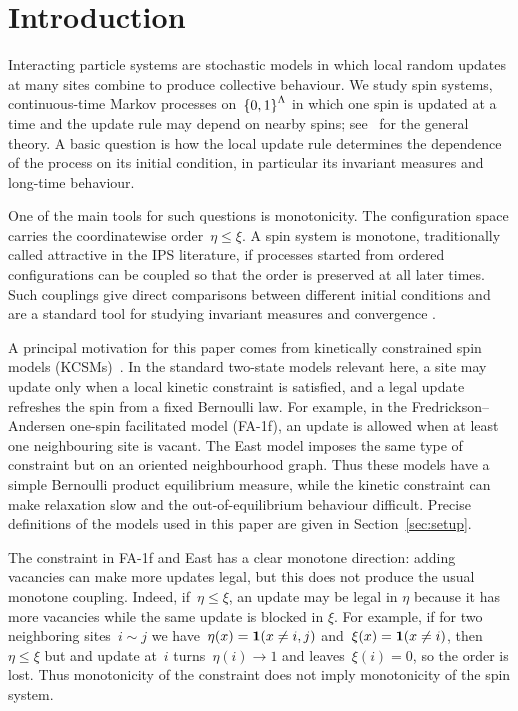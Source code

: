 \documentclass[EJP,preprint,NODS,nobera]{ejpecp}
\begin{document}
\tableofcontents

\section{Introduction}
\label{sec:introduction}

Interacting particle systems are stochastic models in which local random
updates at many sites combine to produce collective behaviour. We study spin
systems, continuous-time Markov processes on~$\left\{0,1\right\}^{\Lambda}$ in which
one spin is updated at a time and the update rule may depend on nearby spins;
see~\cite{Liggett1985} for the general theory. A basic question is how the
local update rule determines the dependence of the process on its initial
condition, in particular its invariant measures and long-time behaviour.

One of the main tools for such questions is monotonicity. The configuration
space carries the coordinatewise order~$\eta\leq\xi$. A spin system is
monotone, traditionally called attractive in the IPS
literature, if processes started from ordered configurations can be coupled so
that the order is preserved at all later times. Such couplings give direct
comparisons between different initial conditions and are a standard tool for
studying invariant measures and convergence
\cite{Harris1977,Liggett1985}.

A principal motivation for this paper comes from kinetically constrained spin
models (KCSMs)~\cite{FredricksonAndersen1984,CancriniEtAl2008,HartarskyToninelli2025}.
In the standard two-state models relevant here, a site may update only when a
local kinetic constraint is satisfied, and a legal update refreshes the spin
from a fixed Bernoulli law. For example, in the Fredrickson--Andersen
one-spin facilitated model (FA-1f), an update is allowed when at least one
neighbouring site is vacant. The East model imposes the same type of
constraint but on an oriented neighbourhood graph. Thus these models have a
simple Bernoulli product equilibrium measure, while the kinetic constraint can
make relaxation slow and the out-of-equilibrium behaviour difficult. Precise
definitions of the models used in this paper are given in
Section~\ref{sec:setup}.

The constraint in FA-1f and East has a clear monotone direction: adding
vacancies can make more updates legal, but this does not produce the usual
monotone coupling. Indeed, if~$\eta\leq\xi$, an update may be legal in
$\eta$ because it has more vacancies while the same update is blocked in
$\xi$. For example, if for two neighboring sites~$i\sim j$ we have~$\eta(x) = \mathbf{1}(x\neq i,j)$ and~$\xi(x)=\mathbf{1}(x\neq i)$, then~$\eta\leq \xi$ but and update at~$i$ turns~$\eta(i)\to 1$ and leaves~$\xi(i)=0$, so the order is lost.
Thus monotonicity of the constraint does not imply monotonicity of the spin
system.
\end{document}
